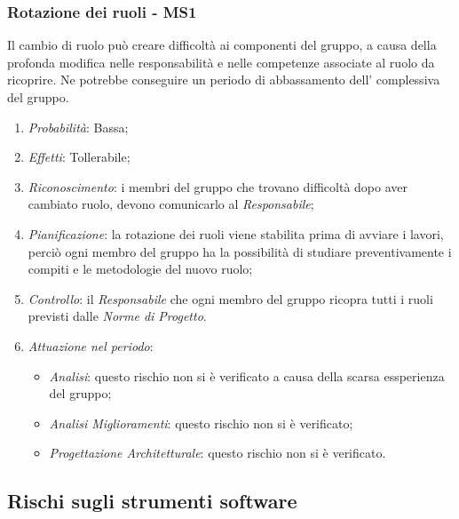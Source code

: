 \subsubsection{Rotazione dei ruoli - MS1}
Il cambio di ruolo pu\`o creare difficolt\`a ai componenti del gruppo, a causa della profonda modifica nelle responsabilit\`a e nelle competenze associate al ruolo da ricoprire. Ne potrebbe conseguire un periodo di abbassamento dell' complessiva del gruppo.
\begin{enumerate}
\item \textit{Probabilit\`a}: Bassa;
\item \textit{Effetti}: Tollerabile;
\item \textit{Riconoscimento}: i membri del gruppo che trovano difficoltà dopo aver cambiato ruolo, devono comunicarlo al \textit{Responsabile};
\item \textit{Pianificazione}: la rotazione dei ruoli viene stabilita prima di avviare i lavori, perci\`o ogni membro del gruppo ha la possibilit\`a di studiare preventivamente i compiti e le metodologie del nuovo ruolo;
\item \textit{Controllo}: il \textit{Responsabile}  che ogni membro del gruppo ricopra tutti i ruoli previsti dalle \textit{Norme di Progetto}.
\item \textit{Attuazione nel periodo}: 
	\begin{itemize}
	\item \textit{Analisi}: questo rischio non si è verificato a causa della scarsa essperienza del gruppo;
	\item \textit{Analisi Miglioramenti}: questo rischio non si è verificato;
	\item \textit{Progettazione Architetturale}: questo rischio non si è verificato.
	\end{itemize}
\end{enumerate}

\subsection{Rischi sugli strumenti software}
